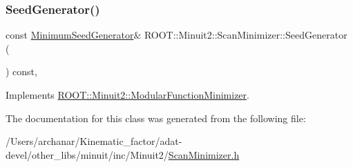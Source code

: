 \mbox{\label{classROOT_1_1Minuit2_1_1ScanMinimizer_aaad34811cf2862cd8b66b634a1c9ba07}} 
\subsubsection{\texorpdfstring{SeedGenerator()}{SeedGenerator()}\hspace{0.1cm}{\footnotesize\ttfamily [3/3]}}
{\footnotesize\ttfamily const \mbox{\hyperlink{classROOT_1_1Minuit2_1_1MinimumSeedGenerator}{Minimum\+Seed\+Generator}}\& R\+O\+O\+T\+::\+Minuit2\+::\+Scan\+Minimizer\+::\+Seed\+Generator (\begin{DoxyParamCaption}{ }\end{DoxyParamCaption}) const\hspace{0.3cm}{\ttfamily [inline]}, {\ttfamily [virtual]}}



Implements \mbox{\hyperlink{classROOT_1_1Minuit2_1_1ModularFunctionMinimizer_a742930de97b0ce9ba23773874ae0894b}{R\+O\+O\+T\+::\+Minuit2\+::\+Modular\+Function\+Minimizer}}.



The documentation for this class was generated from the following file\+:\begin{DoxyCompactItemize}
\item 
/\+Users/archanar/\+Kinematic\+\_\+factor/adat-\/devel/other\+\_\+libs/minuit/inc/\+Minuit2/\mbox{\hyperlink{adat-devel_2other__libs_2minuit_2inc_2Minuit2_2ScanMinimizer_8h}{Scan\+Minimizer.\+h}}\end{DoxyCompactItemize}
